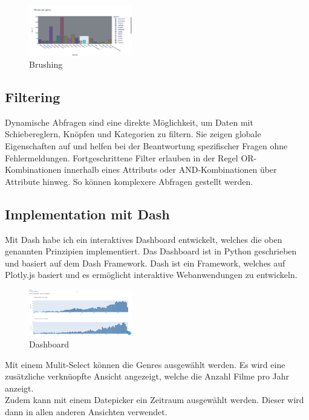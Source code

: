 \documentclass{article}
\begin{document}
\begin{figure}[!h]
\centering
\includegraphics[width=0.4\textwidth]{img/brushing.png}
\caption{\label{fig: LE2 Brushing} Brushing}
\end{figure}

\subsection{Filtering}
Dynamische Abfragen sind eine direkte Möglichkeit, um Daten mit Schiebereglern, Knöpfen und Kategorien zu filtern. 
Sie zeigen globale Eigenschaften auf und helfen bei der Beantwortung spezifischer Fragen ohne Fehlermeldungen. 
Fortgeschrittene Filter erlauben in der Regel OR-Kombinationen innerhalb eines Attributs oder AND-Kombinationen über Attribute hinweg. 
So können komplexere Abfragen gestellt werden.\cite{shneiderman_eyes_1996} \\

\subsection{Implementation mit Dash}

Mit Dash habe ich ein interaktives Dashboard entwickelt, welches die oben genannten Prinzipien implementiert. Das Dashboard ist in Python geschrieben und basiert auf dem Dash Framework. Dash ist ein Framework, welches auf Plotly.js basiert und es ermöglicht interaktive Webanwendungen zu entwickeln.\cite{noauthor_dash_nodate} \\

\begin{figure}[!h]
\centering
\includegraphics[width=0.4\textwidth]{img/dashboard_plotly.png}
\caption{\label{fig: LE2 Dashboard} Dashboard}
\end{figure}

Mit einem Mulit-Select können die Genres ausgewählt werden. Es wird eine zusätzliche verknüopfte Ansicht angezeigt, welche die Anzahl Filme pro Jahr anzeigt.\\
Zudem kann mit einem Datepicker ein Zeitraum ausgewählt werden. Dieser wird dann in allen anderen Ansichten verwendet.\\
\end{document}
